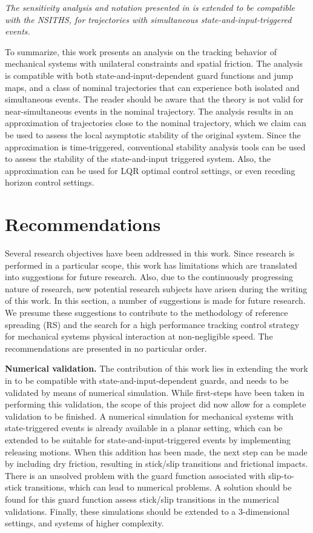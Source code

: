 \documentclass[../DC2017114Bouma.tex]{subfiles}
\begin{document}
\textit{The sensitivity analysis and notation presented in \cite{Rijnen2018a} is extended to be compatible with the NSITHS, for trajectories with simultaneous state-and-input-triggered events.}

To summarize, this work presents an analysis on the tracking behavior of mechanical systems with unilateral constraints and spatial friction. The analysis is compatible with both state-and-input-dependent guard functions and jump maps, and a class of nominal trajectories that can experience both isolated and simultaneous events. The reader should be aware that the theory is not valid for near-simultaneous events in the nominal trajectory. The analysis results in an approximation of trajectories close to the nominal trajectory, which we claim can be used to assess the local asymptotic stability of the original system. Since the approximation is time-triggered, conventional stability analysis tools can be used to assess the stability of the state-and-input triggered system. Also, the approximation can be used for LQR optimal control settings, or even receding horizon control settings.

\section{Recommendations}\label{sec:6rec}
Several research objectives have been addressed in this work. Since research is performed in a particular scope, this work has limitations which are translated into suggestions for future research. Also, due to the continuously progressing nature of research, new potential research subjects have arisen during the writing of this work. In this section, a number of suggestions is made for future research. We presume these suggestions to contribute to the methodology of reference spreading (RS) and the search for a high performance tracking control strategy for mechanical systems physical interaction at non-negligible speed. The recommendations are presented in no particular order.

\textbf{Numerical validation.} The contribution of this work lies in extending the work in \cite{Rijnen2018a} to be compatible with state-and-input-dependent guards, and needs to be validated by means of numerical simulation. While first-steps have been taken in performing this validation, the scope of this project did now allow for a complete validation to be finished. A numerical simulation for mechanical systems with state-triggered events is already available in a planar setting, which can be extended to be suitable for state-and-input-triggered events by implementing releasing motions. When this addition has been made, the next step can be made by including dry friction, resulting in stick/slip transitions and frictional impacts. There is an unsolved problem with the guard function associated with slip-to-stick transitions, which can lead to numerical problems. A solution should be found for this guard function assess stick/slip transitions in the numerical validations. Finally, these simulations should be extended to a 3-dimensional settings, and systems of higher complexity.
\end{document}
